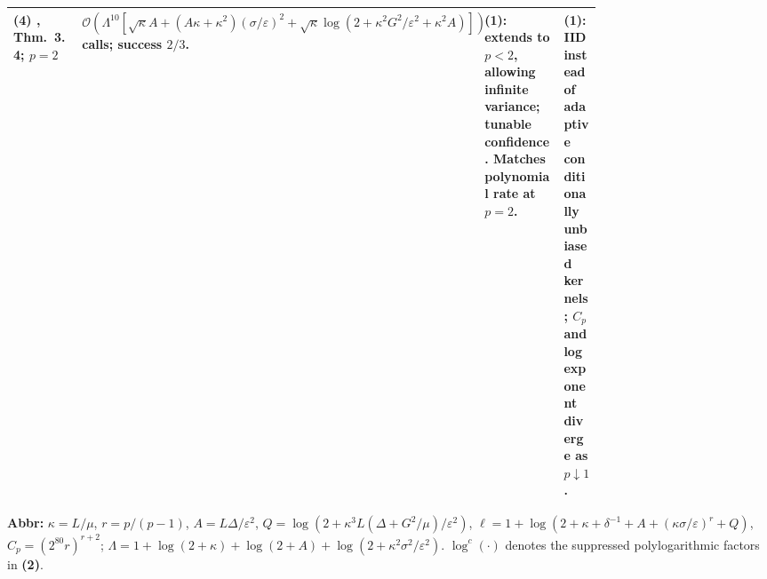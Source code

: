 \begin{table}[tp]
\begin{threeparttable}
\begin{tabularx}{\linewidth}{@{}>{\raggedright\arraybackslash}p{0.20\linewidth}>{\raggedright\arraybackslash}p{0.32\linewidth}>{\raggedright\arraybackslash}p{0.25\linewidth}>{\raggedright\arraybackslash}X@{}}
\midrule
\textbf{(4)} \citep{htWuV2}, Thm.~3.4; $p=2$ & $\mathcal{O}(\Lambda^{10}[\sqrt\kappa A+(A\kappa+\kappa^2)(\sigma/\varepsilon)^2+\sqrt\kappa\log(2+\kappa^2G^2/\varepsilon^2+\kappa^2A)])$ calls; success $2/3$. & \textbf{(1)}: extends to $p<2$, allowing infinite variance; tunable confidence. Matches polynomial rate at $p=2$. & \textbf{(1)}: IID instead of adaptive conditionally unbiased kernels; $C_p$ and log exponent diverge as $p\downarrow1$. \\
\bottomrule
\end{tabularx}
\begin{tablenotes}[flushleft]\footnotesize
\item[] \textbf{Abbr:} $\kappa=L/\mu$, $r=p/(p-1)$, $A=L\Delta/\varepsilon^2$, $Q=\log(2+\kappa^3L(\Delta+G^2/\mu)/\varepsilon^2)$, $\ell=1+\log(2+\kappa+\delta^{-1}+A+(\kappa\sigma/\varepsilon)^r+Q)$, $C_p=(2^{80}r)^{r+2}$; $\Lambda=1+\log(2+\kappa)+\log(2+A)+\log(2+\kappa^2\sigma^2/\varepsilon^2)$. $\log^c(\cdot)$ denotes the suppressed polylogarithmic factors in \textbf{(2)}.
\end{tablenotes}
\end{threeparttable}
\end{table}
\clearpage
